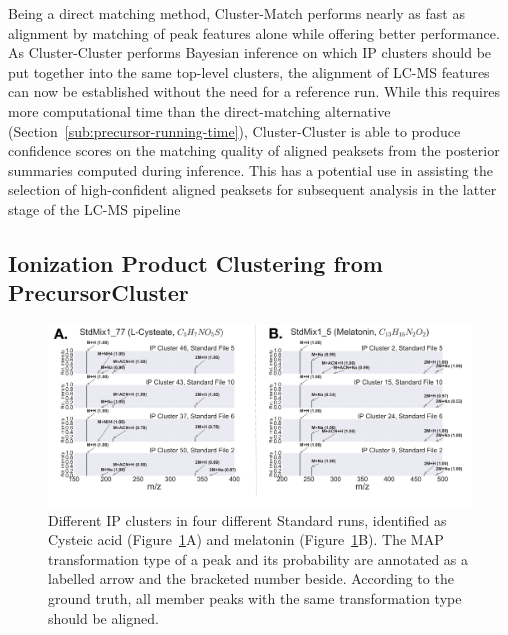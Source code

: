 Being a direct matching method, Cluster-Match performs nearly as fast as alignment by matching of peak features alone while offering better performance. As Cluster-Cluster performs Bayesian inference on which IP clusters should be put together into the same top-level clusters, the alignment of LC-MS features can now be established without the need for a reference run. While this requires more computational time than the direct-matching alternative (Section~\ref{sub:precursor-running-time}), Cluster-Cluster is able to produce confidence scores on the matching quality of aligned peaksets from the posterior summaries computed during inference. This has a potential use in assisting the selection of high-confident aligned peaksets for subsequent analysis in the latter stage of the LC-MS pipeline

\subsection{Ionization Product Clustering from PrecursorCluster\label{sub:precursor-cluster-results}}

\begin{figure}[!htbp]
\centering
\includegraphics[width=1.0\linewidth]{05-precursor-cluster/figures/metabolites.pdf}
\caption[Different IP clusters in four different Standard runs, identified as Cysteic acid (Figure~\ref{fig:06}A) and melatonin (Figure~\ref{fig:06}B).]{\label{fig:06} Different IP clusters in four different Standard runs, identified as Cysteic acid (Figure~\ref{fig:06}A) and melatonin (Figure~\ref{fig:06}B). The MAP transformation type of a peak and its probability are annotated as a labelled arrow and the bracketed number beside. According to the ground truth, all member peaks with the same transformation type should be aligned.}
\end{figure}

